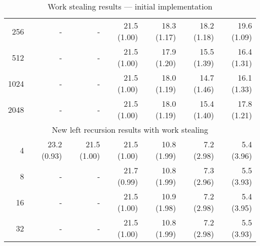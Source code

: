 \begin{table}
\begin{center}
\begin{tabular}{r|rr|rrrr}
256  &-&-& 21.5 (1.00) & 18.3 (1.17) & 18.2 (1.18) & 19.6 (1.09) \\
512  &-&-& 21.5 (1.00) & 17.9 (1.20) & 15.5 (1.39) & 16.4 (1.31) \\
1024 &-&-& 21.5 (1.00) & 18.0 (1.19) & 14.7 (1.46) & 16.1 (1.33) \\
2048 &-&-& 21.5 (1.00) & 18.0 (1.19) & 15.4 (1.40) & 17.8 (1.21) \\
\hline
\hline
\multicolumn{7}{c}{New left recursion results with work stealing} \\
\hline
4        & 23.2 (0.93) & 21.5 (1.00)
         & 21.5 (1.00) & 10.8 (1.99) &  7.2 (2.98) &  5.4 (3.96) \\
8    &-&-& 21.7 (0.99) & 10.8 (1.99) &  7.3 (2.96) &  5.5 (3.93) \\
16   &-&-& 21.5 (1.00) & 10.9 (1.98) &  7.2 (2.98) &  5.4 (3.95) \\
32   &-&-& 21.5 (1.00) & 10.8 (1.99) &  7.2 (2.98) &  5.5 (3.93) \\
\end{tabular}
\end{center}
\caption{Work stealing results --- initial implementation}
\label{tab:work_stealing_initial}
\end{table}

